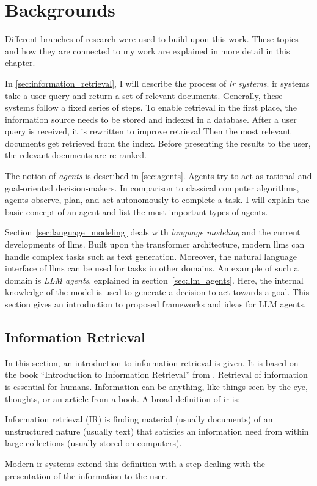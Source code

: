 \documentclass[../main.tex]{subfiles}
\begin{document}
\chapter{Backgrounds}
\label{ch:backgrounds}

Different branches of research were used to build upon this work.
These topics and how they are connected to my work
are explained in more detail in this chapter.

In \autoref{sec:information_retrieval},
I will describe the process of \emph{\gls{ir} systems}.
\Gls{ir} systems take a user query and return a set of relevant documents.
Generally, these systems follow a fixed series of steps.
To enable retrieval in the first place, the information source needs to be stored and
indexed in a database.
After a user query is received, it is rewritten to improve retrieval
Then the most relevant documents get retrieved from the index.
Before presenting the results to the user, the relevant documents are re-ranked.

The notion of \emph{agents} is described in \autoref{sec:agents}.
Agents try to act as rational and goal-oriented decision-makers.
In comparison to classical computer algorithms,
agents observe, plan, and act autonomously to complete a task.
I will explain the basic concept of an agent and list the most important types of agents.

Section~\ref{sec:language_modeling} deals with \emph{language modeling}
and the current developments of \glspl{llm}.
Built upon the transformer architecture,
modern \glspl{llm} can handle complex tasks such as text generation.
Moreover, the natural language interface of \glspl{llm} can be used for tasks in other domains.
An example of such a domain is \emph{LLM agents}, explained in section~\ref{sec:llm_agents}.
Here,
the internal knowledge of the model is used to generate a decision to act towards a goal.
This section gives an introduction to proposed frameworks and ideas for LLM agents.

\section{Information Retrieval}
\label{sec:information_retrieval}
In this section, an introduction to information retrieval is given.
It is based on the book ``Introduction to Information Retrieval''
from \citeauthor{Manning2009} \cite{Manning2009}.
Retrieval of information is essential for humans.
Information can be anything, like things seen by the eye,
thoughts, or an article from a book.
A broad definition of \gls{ir} is:
\begin{displayquote}
    Information retrieval (IR) is finding material (usually documents)
    of an unstructured nature (usually text)
    that satisfies an information need
    from within large collections (usually stored on computers).
\end{displayquote}
Modern \gls{ir} systems extend this definition with a step
dealing with the presentation of the information to the user.
\end{document}
